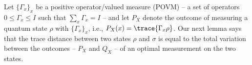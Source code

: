 

Let $\{\Gamma_x\}_{x}$ be a positive operator\-/valued measure (POVM)
\--- a set of operators $0 \leq \Gamma_x \leq I$ such that
$\sum_x \Gamma_x = I$ \--- and let $P_X$ denote the outcome of
measuring a quantum state $\rho$ with $\{\Gamma_x\}_{x}$, i.e.,
$P_X(x) = \trace{\Gamma_x \rho}$. Our next lemma says that the trace
distance between two states $\rho$ and $\sigma$ is equal to the total
variation between the outcomes \--- $P_X$ and $Q_X$ \--- of an optimal
measurement on the two states.

